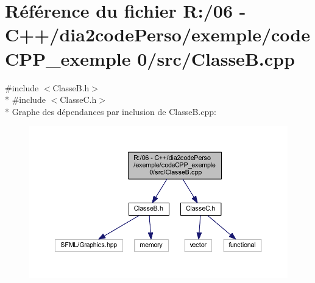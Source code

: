 \section{Référence du fichier R\+:/06 -\/ C++/dia2code\+Perso/exemple/code\+C\+P\+P\+\_\+exemple 0/src/\+Classe\+B.cpp}
\label{_classe_b_8cpp}
{\ttfamily \#include $<$Classe\+B.\+h$>$}\\*
{\ttfamily \#include $<$Classe\+C.\+h$>$}\\*
Graphe des dépendances par inclusion de Classe\+B.\+cpp\+:
\nopagebreak
\begin{figure}[H]
\begin{center}
\leavevmode
\includegraphics[width=350pt]{_classe_b_8cpp__incl}
\end{center}
\end{figure}
